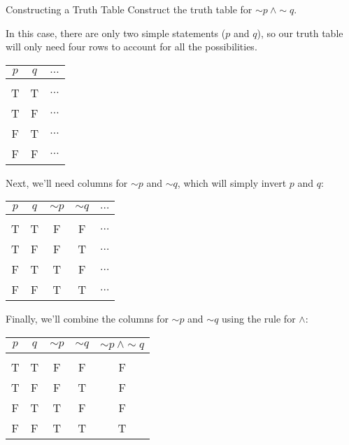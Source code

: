 \begin{example}[https://www.youtube.com/watch?v=cIO6rLWEruw]{Constructing a Truth Table}
Construct the truth table for $\sim p\ \wedge \sim q$.

\sol
In this case, there are only two simple statements ($p$ and $q$), so our truth table will only need four rows to account for all the possibilities.
\begin{center}
\begin{tabular}{|c c c|}
\hline
$p$ & $q$ & $\ldots$\\
\hline
& &\\
T & T & $\ldots$\\
T & F & $\ldots$\\
F & T & $\ldots$\\
F & F & $\ldots$\\
\hline
\end{tabular}
\end{center}

Next, we'll need columns for $\sim p$ and $\sim q$, which will simply invert $p$ and $q$:
\begin{center}
\begin{tabular}{|c c c c c|}
\hline
$p$ & $q$ & $\sim p$ & $\sim q$ & $\ldots$\\
\hline
& & & &\\
T & T & F & F & $\ldots$\\
T & F & F & T & $\ldots$\\
F & T & T & F & $\ldots$\\
F & F & T & T & $\ldots$\\
\hline
\end{tabular}
\end{center}

Finally, we'll combine the columns for $\sim p$ and $\sim q$ using the rule for $\wedge$:
\begin{center}
{\color{green!30!black}
\begin{tabular}{|c c c c c|}
\hline
$p$ & $q$ & $\sim p$ & $\sim q$ & $\sim p\ \wedge \sim q$\\
\hline
& & & &\\
T & T & F & F & F\\
T & F & F & T & F\\
F & T & T & F & F\\
F & F & T & T & T\\
\hline
\end{tabular}}
\end{center}
\end{example}

